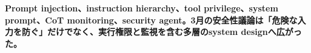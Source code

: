 \noindent\textbf{Prompt injection、instruction hierarchy、tool privilege、system prompt、CoT monitoring、security agent。3月の安全性議論は「危険な入力を防ぐ」だけでなく、実行権限と監視を含む多層のsystem designへ広がった。}\autocite{src-18b7ee4fe5e4,src-3dec299964e6,src-87dacccfecfd,src-b4b340379768}
